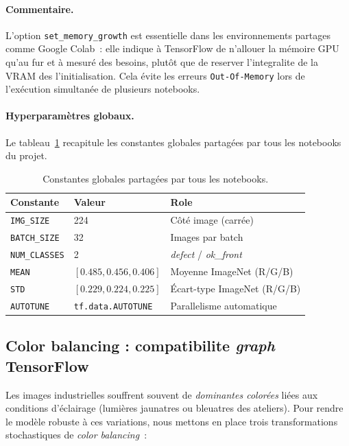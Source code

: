 \documentclass[12pt,a4paper,openany]{report}
\begin{document}
\paragraph{Commentaire.}
L'option \texttt{set\_memory\_growth} est essentielle dans les environnements partages comme Google Colab~: elle indique à TensorFlow de n'allouer la mémoire GPU qu'au fur et à mesuré des besoins, plutôt que de reserver l'integralite de la VRAM des l'initialisation. Cela évite les erreurs \texttt{Out-Of-Memory} lors de l'exécution simultanée de plusieurs notebooks.

\paragraph{Hyperparamètres globaux.}
Le tableau~\ref{tab:hyperparams} recapitule les constantes globales partagées par tous les notebooks du projet.

\begin{table}[H]
\centering
\begin{tabular}{lll}
\toprule
\textbf{Constante} & \textbf{Valeur} & \textbf{Role} \\
\midrule
\texttt{IMG\_SIZE}    & 224                          & Côté image (carrée) \\
\texttt{BATCH\_SIZE}  & 32                           & Images par batch \\
\texttt{NUM\_CLASSES} & 2                            & \emph{defect} / \emph{ok\_front} \\
\texttt{MEAN}         & $[0.485, 0.456, 0.406]$      & Moyenne ImageNet (R/G/B) \\
\texttt{STD}          & $[0.229, 0.224, 0.225]$      & Écart-type ImageNet (R/G/B) \\
\texttt{AUTOTUNE}     & \texttt{tf.data.AUTOTUNE}    & Parallelisme automatique \\
\bottomrule
\end{tabular}
\caption{Constantes globales partagées par tous les notebooks.}
\label{tab:hyperparams}
\end{table}

\subsection{Color balancing : compatibilite \emph{graph} TensorFlow}

Les images industrielles souffrent souvent de \emph{dominantes colorées} liées aux conditions d'éclairage (lumières jaunatres ou bleuatres des ateliers). Pour rendre le modèle robuste à ces variations, nous mettons en place trois transformations stochastiques de \emph{color balancing}~:
\end{document}
